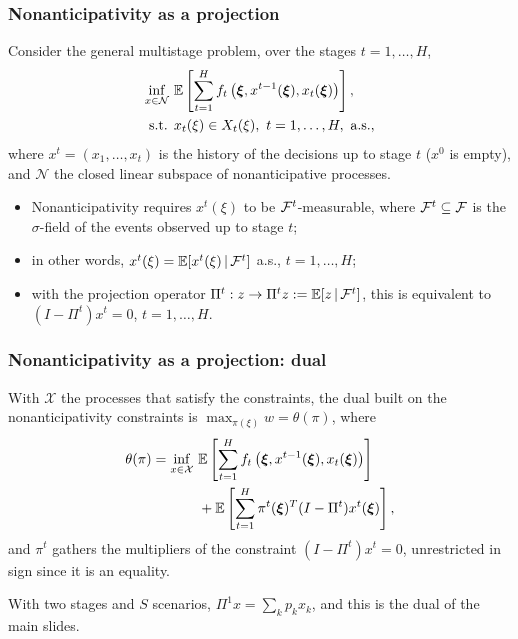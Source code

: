 \documentclass[aspectratio=169]{beamer}
\def\cX{\mathcal{X}}
\begin{document}
\begin{frame}
\frametitle{Nonanticipativity as a projection}

Consider the general multistage problem, over the stages $t = 1, \ldots, H$,
\begin{align*}
\inf_{x \in \mathcal{N}}\ & {\mathbb{E}} \left[ \sum_{t=1}^H f_t\left({\boldsymbol{\xi}}, x^{t-1}({\boldsymbol{\xi}}), x_t({\boldsymbol{\xi}})\right) \right], \\
\mbox{s.t. } & x_t(\xi) \in X_t(\xi),\ t = 1, \ldots, H, \mbox{ a.s.},
\end{align*}
where $x^t = (x_1, \ldots, x_t)$ is the history of the decisions up to stage $t$ ($x^0$ is empty), and $\mathcal{N}$ the closed linear subspace of nonanticipative processes.
\begin{itemize}
\item
Nonanticipativity requires $x^t(\xi)$ to be ${\mathcal{F}}^t$-measurable, where ${\mathcal{F}}^t \subseteq {\mathcal{F}}$ is the $\sigma$-field of the events observed up to stage $t$;
\item
in other words, $x^t(\xi) = {\mathbb{E}}[x^t(\xi) \,|\, {\mathcal{F}}^t]$ a.s., $t = 1,\ldots,H$;
\item
with the projection operator $\Pi^t: z \rightarrow \Pi^t z := {\mathbb{E}}[ z \,|\, {\mathcal{F}}^t]$, this is equivalent to
$(I-\Pi^t)x^t = 0$, $t = 1,\ldots,H$.
\end{itemize}

\end{frame}

\begin{frame}
\frametitle{Nonanticipativity as a projection: dual}

With $\cX$ the processes that satisfy the constraints, the dual built on the nonanticipativity constraints is $\max_{\pi(\xi)} w = \theta(\pi)$, where
\begin{align*}
\theta(\pi) = \inf_{x \in \cX}\ &
\EE\left[\sum_{t = 1}^H f_t\left(\bsxi, x^{t-1}(\bsxi), x_t(\bsxi)\right) \right] \\
& + \EE\left[\sum_{t = 1}^H \pi^t(\bsxi)^T (I-\Pi^t)x^t(\bsxi) \right],
\end{align*}
and $\pi^t$ gathers the multipliers of the constraint $(I-\Pi^t)x^t = 0$, unrestricted in sign since it is an equality.

\medskip

With two stages and $S$ scenarios, $\Pi^1 x = \sum_k p_k x_k$, and this is the dual of the main slides.

\end{frame}
\end{document}
